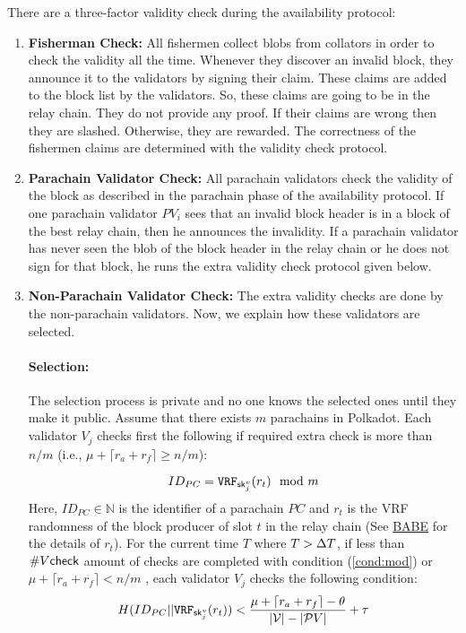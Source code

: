There are a three-factor validity check during the availability protocol:


\begin{enumerate}

      
    \item \textbf{Fisherman Check:} All fishermen collect blobs from collators in order to check the validity all the time. Whenever they discover an invalid block, they announce it to the validators by signing their claim. These claims are added to the block list by the validators. So, these claims are going to be in the relay chain. They do not provide any proof. If their claims are wrong then they are slashed. Otherwise, they are rewarded. The correctness of the fishermen claims are determined with the validity check protocol.
    
    \item \textbf{Parachain Validator Check:} All parachain validators check the validity of the block as described in the parachain phase of the availability protocol. If one parachain validator $PV_i$ sees that an invalid block header is in a block of the best relay chain, then he announces the invalidity. If a parachain validator has never seen the blob of the block header in the relay chain or he does not sign for that block, he runs the extra validity check protocol given below.
    
    \item \textbf{Non-Parachain Validator Check:} The extra validity checks are done by the non-parachain validators. Now, we explain how these validators are selected.
    
    \paragraph{Selection:} The selection process is private and no one knows the selected ones until they make it public. Assume that there exists $m$ parachains in Polkadot. Each validator $V_j$ checks first the following if required extra check is more than $n/m$ (i.e., $\mu + \lceil r_a + r_f \rceil \geq n/m$): 
    
    \begin{equation}\label{cond:mod}
        ID_{PC} = \mathtt{VRF}_{\mathsf{sk}^v_{j}}(r_{t}) \mod m    
    \end{equation}
     Here, $ID_{PC} \in \mathbb{N}$ is the identifier of a parachain $PC$ and $r_{t}$ is the VRF randomness of the block producer of slot $t$ in the relay chain (See \href{http://research.web3.foundation/en/latest/polkadot/BABE/Babe/}{BABE} for the details of $r_t$). For the current time $T$ where $T > \Delta T$, if  less than $\#V\mathsf{check}$ amount of checks are completed with condition (\ref{cond:mod}) or $\mu + \lceil r_a + r_f \rceil < n/m$ , each validator $V_j$ checks the following condition:
     \begin{equation}\label{cond:time}
        H(ID_{PC} || \mathtt{VRF}_{\mathsf{sk}^v_j}(r_t)) < \frac{\mu + \lceil r_a + r_f \rceil - \theta}{|\mathcal{V}|-|\mathcal{P}V|}+\tau  
    \end{equation}
    

\end{enumerate}
